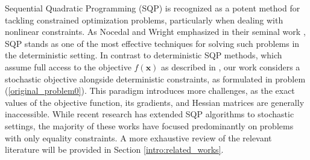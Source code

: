 \documentclass[aos]{imsart}
\numberwithin{equation}{section}
\theoremstyle{plain}
\begin{document}
Sequential Quadratic Programming (SQP) is recognized as a potent method for tackling constrained optimization problems, particularly when dealing with nonlinear constraints. As Nocedal and Wright emphasized in their seminal work \cite{jorge2006numerical}, SQP stands as one of the most effective techniques for solving such problems in the deterministic setting.
In contrast to deterministic SQP methods, which assume full access to the objective $f(\bm{x})$ as described in \cite{boggs1995sequential, jorge2006numerical}, our work considers a stochastic objective alongside deterministic constraints, as formulated in problem (\ref{original_problem0}).
This paradigm introduces more challenges, as the exact values of the objective function, its gradients, and Hessian matrices are generally inaccessible.
While recent research has extended SQP algorithms to stochastic settings\cite{na2022asymptotic, na2023inequality, fang2022fully, na2023adaptive, curtis2023worst, curtis2023sequential, curtis2021inexact, berahas2021stochastic, duchi2021asymptotic}, the majority of these works have focused predominantly on problems with only equality constraints. A more exhaustive review of the relevant literature will be provided in Section \ref{intro:related_works}.
\end{document}
